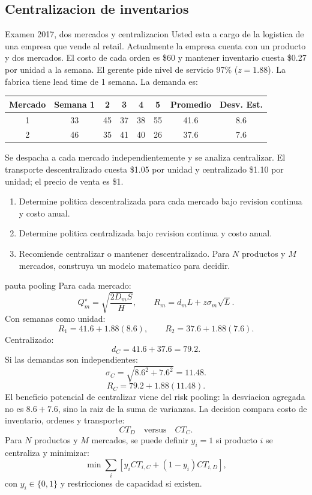 \subsection{Centralizacion de inventarios}

\begin{enunciado}{Examen 2017, dos mercados y centralizacion}
Usted esta a cargo de la logistica de una empresa que vende al retail. Actualmente la empresa cuenta con un producto y dos mercados. El costo de cada orden es \$60 y mantener inventario cuesta \$0.27 por unidad a la semana. El gerente pide nivel de servicio 97\% ($z=1.88$). La fabrica tiene lead time de 1 semana. La demanda es:

\begin{center}
\begin{tabular}{c|ccccc|cc}
\toprule
Mercado & Semana 1 & 2 & 3 & 4 & 5 & Promedio & Desv. Est.\\
\midrule
1 & 33 & 45 & 37 & 38 & 55 & 41.6 & 8.6\\
2 & 46 & 35 & 41 & 40 & 26 & 37.6 & 7.6\\
\bottomrule
\end{tabular}
\end{center}

Se despacha a cada mercado independientemente y se analiza centralizar. El transporte descentralizado cuesta \$1.05 por unidad y centralizado \$1.10 por unidad; el precio de venta es \$1.

\begin{enumerate}[label=\alph*)]
  \item Determine politica descentralizada para cada mercado bajo revision continua y costo anual.
  \item Determine politica centralizada bajo revision continua y costo anual.
  \item Recomiende centralizar o mantener descentralizado. Para $N$ productos y $M$ mercados, construya un modelo matematico para decidir.
\end{enumerate}
\end{enunciado}

\begin{pautacompleta}{pauta pooling}
Para cada mercado:
\[
  Q_m^\star=\sqrt{\frac{2D_mS}{H}},\qquad
  R_m=d_mL+z\sigma_m\sqrt{L}.
\]
Con semanas como unidad:
\[
  R_1=41.6+1.88(8.6),\qquad
  R_2=37.6+1.88(7.6).
\]
Centralizado:
\[
  d_C=41.6+37.6=79.2.
\]
Si las demandas son independientes:
\[
  \sigma_C=\sqrt{8.6^2+7.6^2}=11.48.
\]
\[
  R_C=79.2+1.88(11.48).
\]
El beneficio potencial de centralizar viene del risk pooling: la desviacion agregada no es $8.6+7.6$, sino la raiz de la suma de varianzas. La decision compara costo de inventario, ordenes y transporte:
\[
  CT_D \quad \text{versus}\quad CT_C.
\]
Para $N$ productos y $M$ mercados, se puede definir $y_i=1$ si producto $i$ se centraliza y minimizar:
\[
  \min \sum_i \left[y_i CT_{i,C}+(1-y_i)CT_{i,D}\right],
\]
con $y_i\in\{0,1\}$ y restricciones de capacidad si existen.
\end{pautacompleta}

